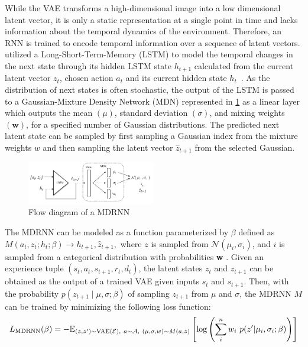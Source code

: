 While the VAE transforms a high-dimensional image into a low dimensional latent vector, it is only a static representation at a single point in time and lacks information about the temporal dynamics of the environment. Therefore, an RNN is trained to encode temporal information over a sequence of latent vectors.  utilized a Long-Short-Term-Memory (LSTM) to model the temporal changes in the next state through its hidden LSTM state $h_{t+1}$ calculated from the current latent vector $z_t$, chosen action $a_t$ and its current hidden state $h_t$~\cite{ha2018recurrent}. As the distribution of next states is often stochastic, the output of the LSTM is passed to a Gaussian-Mixture Density Network (MDN) \cite{bishop1994mixture} represented in \cref{fig:mdrnn} as a linear layer which outputs the mean $(\mu)$, standard deviation $(\sigma)$, and mixing weights $(\textbf{w})$, for a specified number of Gaussian distributions. The predicted next latent state can be sampled by first sampling a Gaussian index from the mixture weights $w$ and then sampling the latent vector $\hat{z}_{t+1}$ from the selected Gaussian. 
\begin{figure}[h]
	\centering
	\includegraphics[width=0.5\textwidth]{images/MDRNN2.pdf}
	\caption{Flow diagram of a MDRNN}\label{fig:mdrnn}
\end{figure}

The MDRNN can be modeled as a function parameterized by $\beta$ defined as $ M(a_t,z_t;h_t;\beta) \rightarrow h_{t+1}, \hat{z}_{t+1},$ where $z$ is sampled from $\mathcal{N}(\mu_i, \sigma_i)$, and $i$ is sampled from a categorical distribution with probabilities \textbf{w} \cite{ellefsen2019mixture}. Given an experience tuple $(s_t, a_t, s_{t+1}, r_t, d_t)$, the latent states $z_t$ and $z_{t+1}$ can be obtained as the output of a trained VAE given inputs $s_t$ and $s_{t+1}$. Then, with the probability $p(z_{t+1} \mid \mu,\sigma;\beta)$ of sampling $z_{t+1}$ from $\mu$ and $\sigma$, the MDRNN $M$ can be trained by minimizing the following loss function:
\begin{dmath}
	L_{\mathrm{MDRNN}}(\beta) = -\mathbb{E}_{(z,z') \sim \mathrm{VAE}(\mathcal{E}),\ a \sim \mathcal{A},\ (\mu,\sigma,w) \sim M(a,z)} \\ \left[ \log \left( \sum^n_i w_i \ p(z' | \mu_i,\sigma_i;\beta) \right) \right] 
\end{dmath} 

